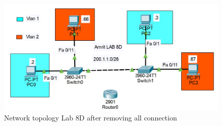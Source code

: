\documentclass[a4paper,11pt]{article}
\begin{document}
\begin{figure}[H]
    \centering
    \includegraphics[scale=0.67,cframe=blue 0.5pt 3pt]{./FIG/Lab8D.jpg}
    \caption{Network topology Lab 8D after removing all connection}
\end{figure}

\end{document}
